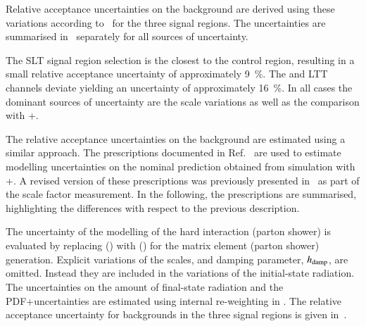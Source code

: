 Relative acceptance uncertainties on the \ZHF background are derived
using these variations according
to~ for the three signal
regions. The uncertainties are summarised
in~ separately for all sources of
uncertainty.

The \lephad SLT signal region selection is the closest to the \ZHF
control region, resulting in a small relative acceptance uncertainty
of approximately \SI{9}{\percent}. The \hadhad and \lephad LTT
channels deviate yielding an uncertainty of approximately
\SI{16}{\percent}. In all cases the dominant sources of uncertainty
are the scale variations as well as the comparison with
\MGNLO+\PYTHIA[8].

The relative acceptance uncertainties on the \ttbar background are
estimated using a similar approach. The prescriptions documented in
Ref.~\cite{ATL-PHYS-PUB-2020-023} are used to estimate modelling
uncertainties on the nominal prediction obtained from simulation with
\POWHEGBOX[v2]+\PYTHIA[8]. A revised version of these prescriptions
was previously presented in~ as part
of the \ttbarFakes scale factor measurement. In the following, the
prescriptions are summarised, highlighting the differences with
respect to the previous description.

The uncertainty of the modelling of the hard interaction (parton
shower) is evaluated by replacing \POWHEGBOX[v2] (\PYTHIA[8]) with
\MGNLO (\HERWIG[7]) for the matrix element (parton shower)
generation. Explicit variations of the scales, and \PYTHIA[8] damping
parameter, $h_\mathrm{damp}$, are omitted. Instead they are included in the
variations of the initial-state radiation. The uncertainties on the
amount of final-state radiation and the PDF+\alphas uncertainties are
estimated using internal re-weighting in \PYTHIA[8]. The relative
acceptance uncertainty for \ttbar backgrounds in the three signal
regions is given in~.

